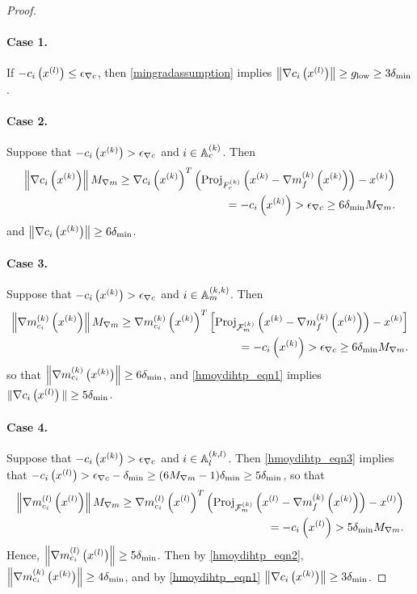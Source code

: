 \begin{proof}
\paragraph*{Case 1.}
If $-c_i\left({x^{(l)}}\right) \le {\epsilon_{\nabla c}}$, then \cref{mingradassumption} implies $\left\| \nabla c_i\left({x^{(l)}}\right) \right\| \ge { g_{\textrm{low}} } \ge 3 {\delta_{\textrm{min}}}$.

\paragraph*{Case 2.}
Suppose that $-c_i\left(x^{(k)}\right) > {\epsilon_{\nabla c}}$ and $i \in {\mathbb A_c^{(k)}}$.
Then
\begin{align*}
\left\|\nabla c_i\left(x^{(k)}\right)  \right\| {M_{\nabla m}}
\ge \nabla c_i\left(x^{(k)}\right) ^T\left({\textrm{Proj}}_{{F_c^{(k)}}}\left(x^{(k)} - {\nabla m_f^{(k)}\left(x^{(k)}\right)}\right) - x^{(k)}\right) \\
= -c_i\left(x^{(k)}\right) > {\epsilon_{\nabla c}} \ge 6 {\delta_{\textrm{min}}} {M_{\nabla m}}.
\end{align*}
and $\left\|\nabla c_i\left(x^{(k)}\right)  \right\| \ge 6 {\delta_{\textrm{min}}}$.


\paragraph*{Case 3.}
Suppose that $-c_i\left(x^{(k)}\right) > {\epsilon_{\nabla c}}$ and $i \in {\mathbb A_m^{(k, k)}}$.
Then
\begin{align*}
\left\|{\nabla m_{c_i}^{(k)}\left(x^{(k)}\right)}\right\| {M_{\nabla m}}
\ge {\nabla m_{c_i}^{(k)}\left(x^{(k)}\right)}^T\left[{\textrm{Proj}}_{{\mathcal F_m^{(k)}}}\left(x^{(k)} - {\nabla m_f^{(k)}\left(x^{(k)}\right)}\right) - x^{(k)}\right] \\
= -c_i\left(x^{(k)}\right) > {\epsilon_{\nabla c}} \ge 6 {\delta_{\textrm{min}}} {M_{\nabla m}}.
\end{align*}
so that $\left\|{\nabla m_{c_i}^{(k)}\left(x^{(k)}\right)}\right\| \ge 6 {\delta_{\textrm{min}}}$, and \cref{hmoydihtp_eqn1} implies $\| \nabla c_i\left({x^{(l)}}\right) \| \ge 5 {\delta_{\textrm{min}}}$.

\paragraph*{Case 4.}
Suppose that $-c_i\left(x^{(k)}\right) > {\epsilon_{\nabla c}}$ and $i \in {\mathbb A_l^{(k, l)}}$.
Then \cref{hmoydihtp_eqn3} implies that $-c_i\left({x^{(l)}}\right) > {\epsilon_{\nabla c}} - {\delta_{\textrm{min}}} \ge (6{M_{\nabla m}} - 1) {\delta_{\textrm{min}}} \ge 5 {\delta_{\textrm{min}}}$, so that
\begin{align*}
\left\|{\nabla m_{c_i}^{(l)}\left({x^{(l)}}\right)}\right\| {M_{\nabla m}}
\ge {\nabla m_{c_i}^{(l)}\left({x^{(l)}}\right)}^T\left({\textrm{Proj}}_{{\mathcal F_m^{(k)}}}\left({x^{(l)}} - {\nabla m_f^{(k)}\left(x^{(k)}\right)}\right) - {x^{(l)}}\right) \\
= -c_i\left({x^{(l)}}\right) > 5 {\delta_{\textrm{min}}} {M_{\nabla m}}.
\end{align*}
Hence, $\left\|{\nabla m_{c_i}^{(l)}\left({x^{(l)}}\right)}\right\| \ge 5 {\delta_{\textrm{min}}}$.
Then by \cref{hmoydihtp_eqn2}, $\left\|{\nabla m_{c_i}^{(k)}\left(x^{(k)}\right)}\right\| \ge 4 {\delta_{\textrm{min}}}$, and by \cref{hmoydihtp_eqn1} $\left\|\nabla c_i\left(x^{(k)}\right) \right\| \ge 3 {\delta_{\textrm{min}}}$.



\end{proof}
